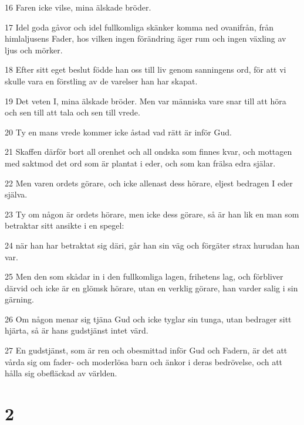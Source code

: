 \par 16 Faren icke vilse, mina älskade bröder.
\par 17 Idel goda gåvor och idel fullkomliga skänker komma ned ovanifrån, från himlaljusens Fader, hos vilken ingen förändring äger rum och ingen växling av ljus och mörker.
\par 18 Efter sitt eget beslut födde han oss till liv genom sanningens ord, för att vi skulle vara en förstling av de varelser han har skapat.
\par 19 Det veten I, mina älskade bröder. Men var människa vare snar till att höra och sen till att tala och sen till vrede.
\par 20 Ty en mans vrede kommer icke åstad vad rätt är inför Gud.
\par 21 Skaffen därför bort all orenhet och all ondska som finnes kvar, och mottagen med saktmod det ord som är plantat i eder, och som kan frälsa edra själar.
\par 22 Men varen ordets görare, och icke allenast dess hörare, eljest bedragen I eder själva.
\par 23 Ty om någon är ordets hörare, men icke dess görare, så är han lik en man som betraktar sitt ansikte i en spegel:
\par 24 när han har betraktat sig däri, går han sin väg och förgäter strax hurudan han var.
\par 25 Men den som skådar in i den fullkomliga lagen, frihetens lag, och förbliver därvid och icke är en glömsk hörare, utan en verklig görare, han varder salig i sin gärning.
\par 26 Om någon menar sig tjäna Gud och icke tyglar sin tunga, utan bedrager sitt hjärta, så är hans gudstjänst intet värd.
\par 27 En gudstjänst, som är ren och obesmittad inför Gud och Fadern, är det att vårda sig om fader- och moderlösa barn och änkor i deras bedrövelse, och att hålla sig obefläckad av världen.

\chapter{2}


